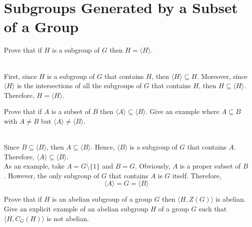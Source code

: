\section{Subgroups Generated by a Subset of a Group}

\begin{exercise}
    Prove that if $H$ is a subgroup of $G$ then $H = \langle H \rangle$. \\
\end{exercise}

\begin{solution}
    \\ First, since $H$ is a subgroup of $G$ that contains $H$, then $\langle H \rangle \subseteq H$. Moreover, since $\langle H \rangle$ is the intersections of all the subgroups of $G$ that contains $H$, then $H \subseteq \langle H \rangle$. Therefore, $H = \langle H \rangle$.\\
\end{solution}

\begin{exercise}
    Prove that if $A$ is a subset of $B$ then $\langle A \rangle \subseteq \langle B \rangle$. Give an example where $A \subseteq B$ with $A \neq B$ but $\langle A \rangle \neq \langle B \rangle$. \\
\end{exercise}

\begin{solution}
    \\ Since $B \subseteq \langle B \rangle$, then $A \subseteq \langle B \rangle$. Hence, $\langle B \rangle$ is a subgroup of $G$ that contains $A$. Therefore, $\langle A \rangle \subseteq \langle B \rangle$. \\
    As an example, take $A = G\setminus \{1\}$ and $B = G$. Obviously, $A$ is a proper subset of $B$. However, the only subgroup of $G$ that contains $A$ is $G$ itself. Therefore,
    $$ \langle A \rangle = G =  \langle B \rangle$$
\end{solution}

\begin{exercise}
    Prove that if $H$ is an abelian subgroup of a group $G$ then $ \langle H, Z(G) \rangle$ is abelian. Give an explicit example of an abelian subgroup $H$ of a group $G$ such that $ \langle H, C_G(H) \rangle$ is not abelian. \\
\end{exercise}

